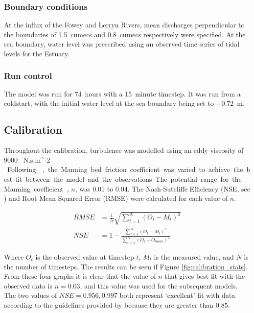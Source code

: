 \documentclass{article}
\begin{document}
\subsubsection{Boundary conditions}
At the influx of the Fowey and Lerryn Rivers, mean discharges perpendicular to the boundaries of \SI{1.5}{cumecs} and \SI{0.8}{cumecs} respectively were specified. At the sea boundary, water level was prescribed using an observed time series of tidal levels for the Estuary.

\subsubsection{Run control}
The model was run for \SI{74}{hours} with a \SI{15}{minute} timestep. It was run from a coldstart, with the initial water level at the sea boundary being set to \SI{-0.72}{m}. 

\subsection{Calibration}

Throughout the calibration, turbulence was modelled using an eddy viscosity of \SI{9000}{ N.s.m^{-2} }.
Following \textcite{piedra2007residual, sousa2007hydrodynamic}, the  Manning bed friction coefficient was varied to achieve the best fit between the model and the observations. The potential range for the Manning coefficient, $n$, was 0.01 to 0.04. The Nash-Sutcliffe Efficiency (NSE, see \textcite{nash1970river}) and Root Mean Squared Error (RMSE) were calculated for each value of $n$. 

\begin{align*}
    RMSE &= \frac{1}{N} \sqrt{ \sum_{t = 1}^N ( O_t - M_t) ^ 2 }\\
    NSE  &= 1 - \frac{\sum_{t = 1}^N ( O_t - M_t) ^ 2 }{\sum_{t = 1}^N ( O_t - O_{mean}) ^ 2 }
\end{align*}

Where $O_t$ is the observed value at timestep $t$, $M_t$ is the measured value, and $N$ is the number of timesteps. The results can be seen if Figure \ref{fig:calibration_stats}. From these four graphs it is clear that the value of $n$ that gives best fit with the observed data is $n = 0.03$, and this value was used for the subsequent models. The two values of $NSE = 0.956, 0.997$ both represent `excellent' fit with data according to the guidelines provided by \textcite{henriksen2008assessment} because they are greater than $0.85$. 
\end{document}
